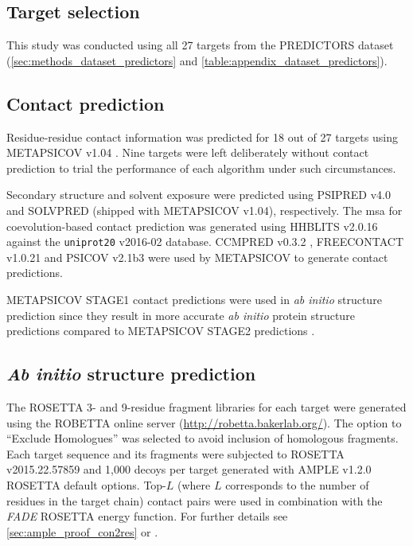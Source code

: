\subsection{Target selection}
This study was conducted using all 27 targets from the PREDICTORS dataset (\cref{sec:methods_dataset_predictors} and \cref{table:appendix_dataset_predictors}).

\subsection{Contact prediction}
Residue-residue contact information was predicted for 18 out of 27 targets using METAPSICOV v1.04 \cite{Jones2015-vq}. Nine targets were left deliberately without contact prediction to trial the performance of each algorithm under such circumstances.

Secondary structure and solvent exposure were predicted using PSIPRED v4.0 \cite{Jones1999-ed} and SOLVPRED (shipped with METAPSICOV v1.04), respectively. The \gls{msa} for coevolution-based contact prediction was generated using HHBLITS v2.0.16 \cite{Remmert2011-kt} against the \texttt{uniprot20} v2016-02 database. CCMPRED v0.3.2 \cite{Seemayer2014-zp}, FREECONTACT v1.0.21 \cite{Kajan2014-bx} and PSICOV v2.1b3 \cite{Jones2012-ks} were used by METAPSICOV to generate contact predictions.

METAPSICOV STAGE1 contact predictions were used in \textit{ab initio} structure prediction since they result in more accurate \textit{ab initio} protein structure predictions compared to METAPSICOV STAGE2 predictions \cite{Jones2015-vq}.

\subsection{\textit{Ab initio} structure prediction} \label{sec:ample_saint2_modelling}
The ROSETTA 3- and 9-residue fragment libraries for each target were generated using the ROBETTA online server (\url{http://robetta.bakerlab.org/}). The option to ``Exclude Homologues'' was selected to avoid inclusion of homologous fragments. Each target sequence and its fragments were subjected to ROSETTA v2015.22.57859 \cite{Rohl2004-dj} and 1,000 decoys per target generated with AMPLE v1.2.0 ROSETTA default options. Top-$L$ (where $L$ corresponds to the number of residues in the target chain) contact pairs were used in combination with the \textit{FADE} ROSETTA energy function. For further details see \cref{sec:ample_proof_con2res} or \textcite{Michel2014-eg}.

